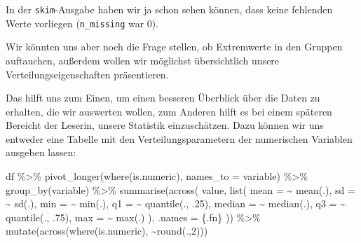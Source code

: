 \documentclass[
]{book}
\newenvironment{Shaded}{\begin{snugshade}}{\end{snugshade}}
\newcommand{\AttributeTok}[1]{\textcolor[rgb]{0.77,0.63,0.00}{#1}}
\newcommand{\DecValTok}[1]{\textcolor[rgb]{0.00,0.00,0.81}{#1}}
\newcommand{\FunctionTok}[1]{\textcolor[rgb]{0.00,0.00,0.00}{#1}}
\newcommand{\NormalTok}[1]{#1}
\newcommand{\SpecialCharTok}[1]{\textcolor[rgb]{0.00,0.00,0.00}{#1}}
\newcommand{\StringTok}[1]{\textcolor[rgb]{0.31,0.60,0.02}{#1}}
\begin{document}
In der \texttt{skim}-Ausgabe haben wir ja schon sehen können, dass keine fehlenden Werte vorliegen (\texttt{n\_missing} war 0).

Wir könnten uns aber noch die Frage stellen, ob Extremwerte in den Gruppen auftauchen, außerdem wollen wir möglichst übersichtlich unsere Verteilungseigenschaften präsentieren.

Das hilft uns zum Einen, um einen besseren Überblick über die Daten zu erhalten, die wir auswerten wollen, zum Anderen hilft es bei einem späteren Bereicht der Leserin, unsere Statistik einzuschätzen.
Dazu können wir uns entweder eine Tabelle mit den Verteilungsparametern der numerischen Variablen ausgeben lassen:

\begin{Shaded}
\begin{Highlighting}[]
\NormalTok{df }\SpecialCharTok{\%\textgreater{}\%} 
  \FunctionTok{pivot\_longer}\NormalTok{(}\FunctionTok{where}\NormalTok{(is.numeric),}
               \AttributeTok{names\_to =} \StringTok{\textquotesingle{}variable\textquotesingle{}}\NormalTok{) }\SpecialCharTok{\%\textgreater{}\%} 
  \FunctionTok{group\_by}\NormalTok{(variable) }\SpecialCharTok{\%\textgreater{}\%} 
  \FunctionTok{summarise}\NormalTok{(}\FunctionTok{across}\NormalTok{(}
\NormalTok{    value,}
    \FunctionTok{list}\NormalTok{(}
      \AttributeTok{mean =} \SpecialCharTok{\textasciitilde{}} \FunctionTok{mean}\NormalTok{(.),}
      \AttributeTok{sd =} \SpecialCharTok{\textasciitilde{}} \FunctionTok{sd}\NormalTok{(.),}
      \AttributeTok{min =} \SpecialCharTok{\textasciitilde{}} \FunctionTok{min}\NormalTok{(.),}
      \AttributeTok{q1 =} \SpecialCharTok{\textasciitilde{}} \FunctionTok{quantile}\NormalTok{(., .}\DecValTok{25}\NormalTok{),}
      \AttributeTok{median =} \SpecialCharTok{\textasciitilde{}} \FunctionTok{median}\NormalTok{(.),}
      \AttributeTok{q3 =} \SpecialCharTok{\textasciitilde{}} \FunctionTok{quantile}\NormalTok{(., .}\DecValTok{75}\NormalTok{),}
      \AttributeTok{max =} \SpecialCharTok{\textasciitilde{}} \FunctionTok{max}\NormalTok{(.)}
\NormalTok{    ),}
    \AttributeTok{.names =} \StringTok{\textquotesingle{}\{.fn\}\textquotesingle{}}
\NormalTok{  )) }\SpecialCharTok{\%\textgreater{}\%} 
  \FunctionTok{mutate}\NormalTok{(}\FunctionTok{across}\NormalTok{(}\FunctionTok{where}\NormalTok{(is.numeric),}
                \SpecialCharTok{\textasciitilde{}}\FunctionTok{round}\NormalTok{(.,}\DecValTok{2}\NormalTok{)))}
\end{Highlighting}
\end{Shaded}
\end{document}
